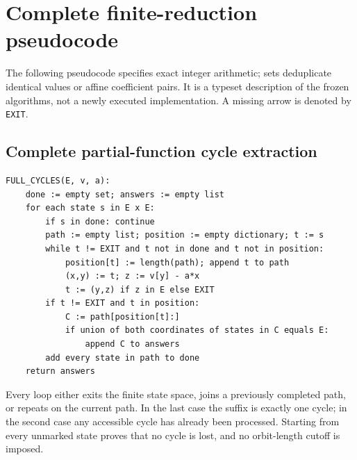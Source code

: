 \section{Complete finite-reduction pseudocode}\label{app:pseudocode}

The following pseudocode specifies exact integer arithmetic; sets
deduplicate identical values or affine coefficient pairs. It is a
typeset description of the frozen algorithms, not a newly executed
implementation. A missing arrow is denoted by \texttt{EXIT}.

\subsection{Complete partial-function cycle extraction}
\begin{Verbatim}[fontsize=\small]
FULL_CYCLES(E, v, a):
    done := empty set; answers := empty list
    for each state s in E x E:
        if s in done: continue
        path := empty list; position := empty dictionary; t := s
        while t != EXIT and t not in done and t not in position:
            position[t] := length(path); append t to path
            (x,y) := t; z := v[y] - a*x
            t := (y,z) if z in E else EXIT
        if t != EXIT and t in position:
            C := path[position[t]:]
            if union of both coordinates of states in C equals E:
                append C to answers
        add every state in path to done
    return answers
\end{Verbatim}
Every loop either exits the finite state space, joins a previously
completed path, or repeats on the current path. In the last case
the suffix is exactly one cycle; in the second case any accessible
cycle has already been processed. Starting from every unmarked
state proves that no cycle is lost, and no orbit-length cutoff
is imposed.

